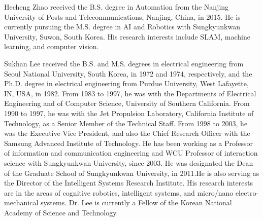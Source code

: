 \documentclass{ieeeaccess}
\begin{document}
\begin{IEEEbiography}{Hecheng Zhao} received the B.S. degree
in Automation from
the Nanjing University of Posts and Telecommunications,
Nanjing, China, in 2015. He is currently pursuing the M.S. degree in AI and Robotics with Sungkyunkwan University,
Suwon, South Korea.
His research interests include SLAM, machine learning, and computer vision.
\end{IEEEbiography}

\begin{IEEEbiography}{Sukhan Lee}  received the B.S. and M.S. degrees
in electrical engineering from Seoul National
University, South Korea, in 1972 and 1974, respectively, and the Ph.D. degree in electrical engineering from Purdue University, West Lafayette, IN,
USA, in 1982.
From 1983 to 1997, he was with the Departments of Electrical Engineering and of Computer
Science, University of Southern California. From
1990 to 1997, he was with the Jet Propulsion
Laboratory, California Institute of Technology, as a Senior Member of the
Technical Staff. From 1998 to 2003, he was the Executive Vice President,
and also the Chief Research Officer with the Samsung Advanced Institute
of Technology. He has been working as a Professor of information and
communication engineering and WCU Professor of interaction science with
Sungkyunkwan University, since 2003. He was designated the Dean of the
Graduate School of Sungkyunkwan University, in 2011.He is also serving
as the Director of the Intelligent Systems Research Institute. His research
interests are in the areas of cognitive robotics, intelligent systems, and
micro/nano electro-mechanical systems.
Dr. Lee is currently a Fellow of the Korean National Academy of Science
and Technology.
\end{IEEEbiography}

\EOD
\end{document}
